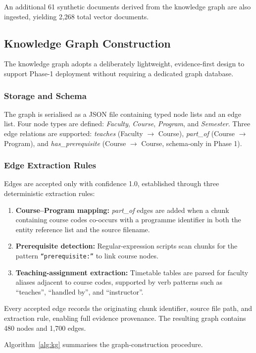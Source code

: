 \documentclass{ieeeaccess}
\begin{document}
An additional 61 synthetic documents derived from the knowledge graph are also ingested, yielding 2,268 total vector documents.

\subsection{Knowledge Graph Construction}
The knowledge graph adopts a deliberately lightweight, evidence-first design to support Phase-1 deployment without requiring a dedicated graph database.

\subsubsection{Storage and Schema}
The graph is serialised as a JSON file containing typed node lists and an edge list. Four node types are defined: \textit{Faculty}, \textit{Course}, \textit{Program}, and \textit{Semester}. Three edge relations are supported: \textit{teaches} (Faculty $\rightarrow$ Course), \textit{part\_of} (Course $\rightarrow$ Program), and \textit{has\_prerequisite} (Course $\rightarrow$ Course, schema-only in Phase 1).

\subsubsection{Edge Extraction Rules}
Edges are accepted only with confidence 1.0, established through three deterministic extraction rules:
\begin{enumerate}
    \item \textbf{Course--Program mapping:} \textit{part\_of} edges are added when a chunk containing course codes co-occurs with a programme identifier in both the entity reference list and the source filename.
    \item \textbf{Prerequisite detection:} Regular-expression scripts scan chunks for the pattern \texttt{``prerequisite:''} to link course nodes.
    \item \textbf{Teaching-assignment extraction:} Timetable tables are parsed for faculty aliases adjacent to course codes, supported by verb patterns such as ``teaches'', ``handled by'', and ``instructor''.
\end{enumerate}

Every accepted edge records the originating chunk identifier, source file path, and extraction rule, enabling full evidence provenance. The resulting graph contains 480 nodes and 1,700 edges.

Algorithm~\ref{alg:kg} summarises the graph-construction procedure.
\end{document}
